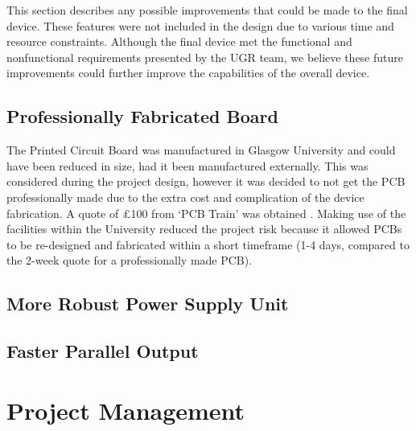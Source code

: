 \documentclass[a4paper,12pt]{article}
\begin{document}
This section describes any possible improvements that could be made to the final device. These features were not included in the design due to various time and resource constraints. Although the final device met the functional and nonfunctional requirements presented by the UGR team, we believe these future improvements could further improve the capabilities of the overall device.

\subsection{Professionally Fabricated Board}
\label{sec:future_improvement_1}

The Printed Circuit Board was manufactured in Glasgow University and could have been reduced in size, had it been manufactured externally. This was considered during the project design, however it was decided to not get the PCB professionally made due to the extra cost and complication of the device fabrication. A quote of £100 from ‘PCB Train’ was obtained \cite{pcb_train}. Making use of the facilities within the University reduced the project risk because it allowed PCBs to be re-designed and fabricated within a short timeframe (1-4 days, compared to the 2-week quote for a professionally made PCB).

\subsection{More Robust Power Supply Unit}
\label{sec:future_improvement_2}

\subsection{Faster Parallel Output}
\label{sec:future_improvement_3}


\newpage
\section{Project Management}
\label{sec:project_management}


\newpage


\end{document}
